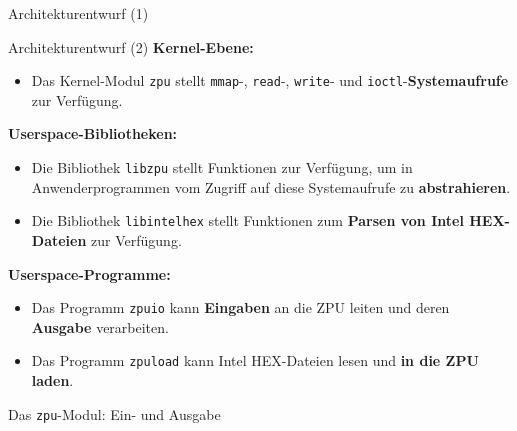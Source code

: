 \documentclass[10pt]{beamer}
\begin{document}
	\begin{frame}{Architekturentwurf (1)}
	\begin{center}
		
	\end{center}
	\end{frame}
	
	\begin{frame}{Architekturentwurf (2)}
		\textbf{Kernel-Ebene:}
		\begin{itemize}
			\item Das Kernel-Modul \texttt{zpu} stellt \texttt{mmap}-, \texttt{read}-, \texttt{write}- und \texttt{ioctl}-\textbf{Systemaufrufe} zur Verfügung.
		\end{itemize}
		\textbf{Userspace-Bibliotheken:}
		\begin{itemize}
			\item Die Bibliothek \texttt{libzpu} stellt Funktionen zur Verfügung, um in Anwenderprogrammen vom Zugriff auf diese Systemaufrufe zu \textbf{abstrahieren}.
			\item Die Bibliothek \texttt{libintelhex} stellt Funktionen zum \textbf{Parsen von Intel HEX-Dateien} zur Verfügung.
		\end{itemize}
		\textbf{Userspace-Programme:}
		\begin{itemize}
			\item Das Programm \texttt{zpuio} kann \textbf{Eingaben} an die ZPU leiten und deren \textbf{Ausgabe} verarbeiten.
			\item Das Programm \texttt{zpuload} kann Intel HEX-Dateien lesen und \textbf{in die ZPU laden}.
		\end{itemize}
	\end{frame}
	
	\begin{frame}{Das \texttt{zpu}-Modul: Ein- und Ausgabe}
		\begin{center}
			
		\end{center}
	\end{frame}
	
\end{document}
